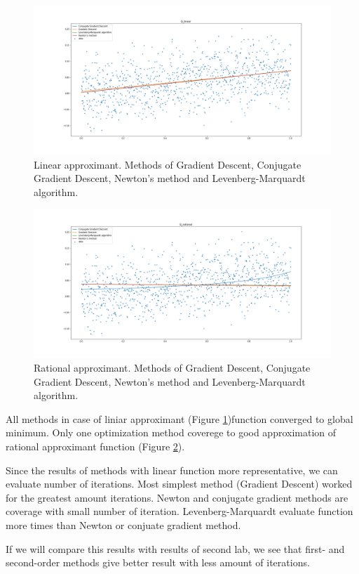 \documentclass[a4paper,article,14pt]{extarticle}
\begin{document}
	\begin{figure}[h!]
		\centering
		\includegraphics[scale=0.3]{D_linear.png}
		\caption{Linear approximant. Methods of Gradient Descent, Conjugate Gradient Descent, Newton’s method and Levenberg-Marquardt algorithm.}
		\label{linear}
	\end{figure} 
	
	\begin{figure}[h]
		\centering
		\includegraphics[scale=0.3]{D_rational.png}
		\caption{Rational approximant. Methods of Gradient Descent, Conjugate Gradient Descent, Newton’s method and Levenberg-Marquardt algorithm.}
		\label{rational}
	\end{figure} 
	
	All methods in case of liniar approximant (Figure \ref{linear})function converged to global minimum. Only one optimization method coverege to good approximation of rational approximant function (Figure \ref{rational}).
	
	Since the results of methods with linear function more representative, we can evaluate number of iterations. Most simplest method (Gradient Descent) worked for the greatest amount iterations. Newton and conjugate gradient methods are coverage with small number of iteration. Levenberg-Marquardt evaluate function more times than Newton or conjuate gradient method.
	
	If we will compare this results with results of second lab, we see that first- and second-order methods give better result with less amount of iterations.
	

	
\end{document}
